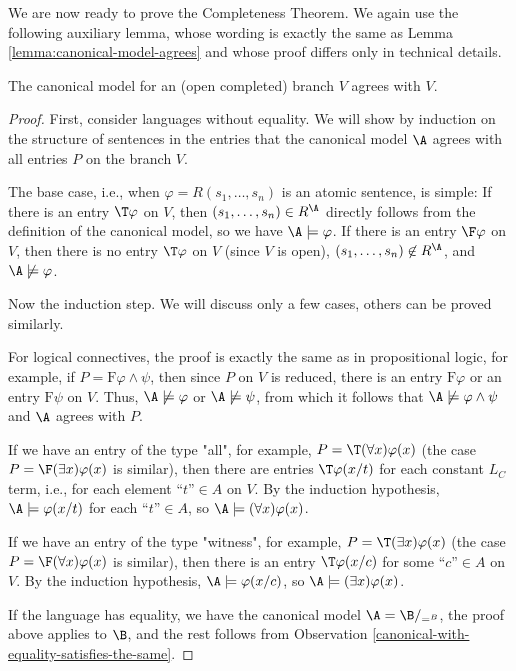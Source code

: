 We are now ready to prove the Completeness Theorem. We again use the following auxiliary lemma, whose wording is exactly the same as Lemma \ref{lemma:canonical-model-agrees} and whose proof differs only in technical details.

\begin{lemma}\label{lemma:canonical-model-agrees-predicate}
    The canonical model for an (open completed) branch $V$ agrees with $V$.
\end{lemma}
\begin{proof}
First, consider languages without equality. We will show by induction on the structure of sentences in the entries that the canonical model $\A$ agrees with all entries $P$ on the branch $V$. 

The base case, i.e., when $\varphi=R(s_1,\dots,s_n)$ is an atomic sentence, is simple: If there is an entry $\T\varphi$ on $V$, then $(s_1,\dots,s_n)\in R^\A$ directly follows from the definition of the canonical model, so we have $\A\models\varphi$. If there is an entry $\F\varphi$ on $V$, then there is no entry $\T\varphi$ on $V$ (since $V$ is open), $(s_1,\dots,s_n)\not\in R^\A$, and $\A\not\models\varphi$.

Now the induction step. We will discuss only a few cases, others can be proved similarly. 

For logical connectives, the proof is exactly the same as in propositional logic, for example, if $P=\mathrm{F}\varphi\land\psi$, then since $P$ on $V$ is reduced, there is an entry $\mathrm{F}\varphi$ or an entry $\mathrm{F}\psi$ on $V$. Thus, $\A\not\models\varphi$ or $\A\not\models\psi$, from which it follows that $\A\not\models\varphi\land\psi$ and $\A$ agrees with $P$.

If we have an entry of the type "all", for example, $P=\T(\forall x)\varphi(x)$ 
(the case $P=\F(\exists x)\varphi(x)$ is similar), then there are entries $\T\varphi(x/t)$ for each constant $L_C$ term, i.e., for each element $\text{``$t$''}\in A$ on $V$. By the induction hypothesis, $\A\models\varphi(x/t)$ for each $\text{``$t$''}\in A$, so $\A\models(\forall x)\varphi(x)$.

If we have an entry of the type "witness", for example, $P=\T(\exists x)\varphi(x)$ 
(the case $P=\F(\forall x)\varphi(x)$ is similar), then there is an entry $\T\varphi(x/c)$ for some $\text{``$c$''}\in A$ on $V$. By the induction hypothesis, $\A\models\varphi(x/c)$, so $\A\models(\exists x)\varphi(x)$.

If the language has equality, we have the canonical model $\A=\B/_{=^B}$, the proof above applies to $\B$, and the rest follows from Observation \ref{canonical-with-equality-satisfies-the-same}.
\end{proof}

